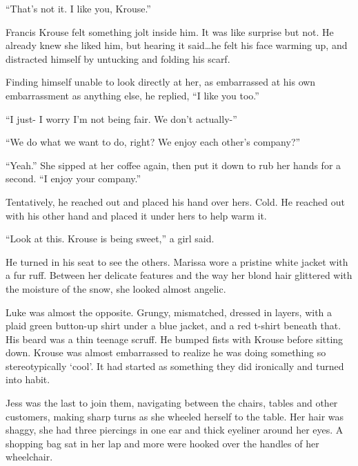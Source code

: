 ``That's not it.  I like you, Krouse.''



Francis Krouse felt something jolt inside him.  It was like surprise but not.  He already knew she liked him, but hearing it said\ldots  he felt his face warming up, and distracted himself by untucking and folding his scarf.



Finding himself unable to look directly at her, as embarrassed at his own embarrassment as anything else, he replied, ``I like you too.''



``I just- I worry I'm not being fair.  We don't actually-''



``We do what we want to do, right?  We enjoy each other's company?''



``Yeah.''  She sipped at her coffee again, then put it down to rub her hands for a second.  ``I enjoy your company.''



Tentatively, he reached out and placed his hand over hers.  Cold.  He reached out with his other hand and placed it under hers to help warm it.



``Look at this.  Krouse is being sweet,'' a girl said.



He turned in his seat to see the others.  Marissa wore a pristine white jacket with a fur ruff.  Between her delicate features and the way her blond hair glittered with the moisture of the snow, she looked almost angelic.



Luke was almost the opposite.  Grungy, mismatched, dressed in layers, with a plaid green button-up shirt under a blue jacket, and a red t-shirt beneath that.  His beard was a thin teenage scruff.  He bumped fists with Krouse before sitting down.  Krouse was almost embarrassed to realize he was doing something so stereotypically `cool'.  It had started as something they did ironically and turned into habit.



Jess was the last to join them, navigating between the chairs, tables and other customers, making sharp turns as she wheeled herself to the table.  Her hair was shaggy, she had three piercings in one ear and thick eyeliner around her eyes.  A shopping bag sat in her lap and more were hooked over the handles of her wheelchair.



